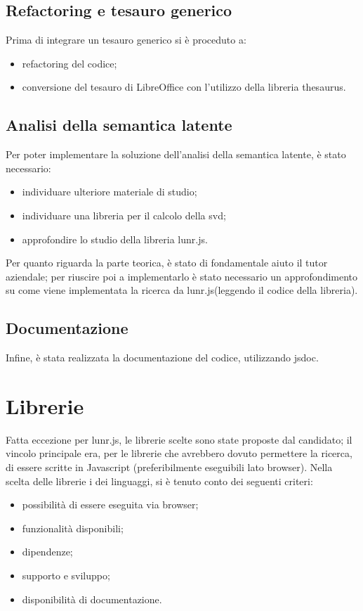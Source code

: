 \subsection{Refactoring e tesauro generico}
Prima di integrare un tesauro generico si è proceduto a:
\begin{itemize}
    \item refactoring del codice;
    \item conversione del tesauro di LibreOffice con l'utilizzo della libreria thesaurus.
\end{itemize}

\subsection{Analisi della semantica latente}
Per poter implementare la soluzione dell'analisi della semantica latente, è stato necessario:
\begin{itemize}
    \item individuare ulteriore materiale di studio;
    \item individuare una libreria per il calcolo della \gls{svd};
    \item approfondire lo studio della libreria lunr.js.
\end{itemize}

Per quanto riguarda la parte teorica, è stato di fondamentale aiuto il tutor aziendale; per riuscire poi a implementarlo è stato necessario un approfondimento su come viene implementata la ricerca da lunr.js(leggendo il codice della libreria).

\subsection{Documentazione}
Infine, è stata realizzata la documentazione del codice, utilizzando \gls{jsdoc}.
\section{Librerie}
Fatta eccezione per lunr.js, le librerie scelte sono state proposte dal candidato; il vincolo principale era, per le librerie che avrebbero dovuto permettere la ricerca, di essere scritte in Javascript (preferibilmente eseguibili lato browser).
Nella scelta delle librerie i dei linguaggi, si è tenuto conto dei seguenti criteri:
\begin{itemize}
    \item possibilità di essere eseguita via browser;
    \item funzionalità disponibili;
    \item dipendenze;
    \item supporto e sviluppo;
    \item disponibilità di documentazione.
\end{itemize}

